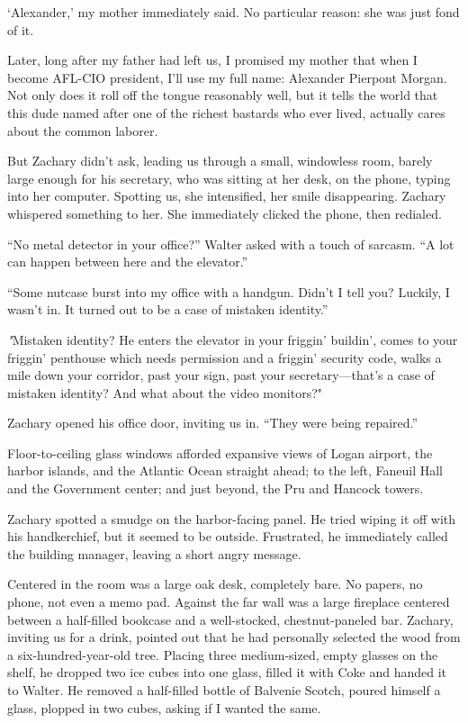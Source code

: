 `Alexander,' my mother immediately said. No particular reason: she was
just fond of it.

Later, long after my father had left us, I promised my mother that when
I become AFL-CIO president, I'll use my full name: Alexander Pierpont
Morgan. Not only does it roll off the tongue reasonably well, but it
tells the world that this dude named after one of the richest bastards
who ever lived, actually cares about the common laborer.

But Zachary didn't ask, leading us through a small, windowless room,
barely large enough for his secretary, who was sitting at her desk, on
the phone, typing into her computer. Spotting us, she intensified, her
smile disappearing. Zachary whispered something to her. She immediately
clicked the phone, then redialed.

``No metal detector in your office?'' Walter asked with a touch of
sarcasm. ``A lot can happen between here and the elevator.''

``Some nutcase burst into my office with a handgun. Didn't I tell you?
Luckily, I wasn't in. It turned out to be a case of mistaken identity.''

\emph{"}Mistaken identity? He enters the elevator in your friggin'
buildin', comes to your friggin' penthouse which needs permission and a
friggin' security code, walks a mile down your corridor, past your sign,
past your secretary---that's a case of mistaken identity? And what about
the video monitors?"

Zachary opened his office door, inviting us in. ``They were being
repaired.''

Floor-to-ceiling glass windows afforded expansive views of Logan
airport, the harbor islands, and the Atlantic Ocean straight ahead; to
the left, Faneuil Hall and the Government center; and just beyond, the
Pru and Hancock towers.

Zachary spotted a smudge on the harbor-facing panel. He tried wiping it
off with his handkerchief, but it seemed to be outside. Frustrated, he
immediately called the building manager, leaving a short angry message.

Centered in the room was a large oak desk, completely bare. No papers,
no phone, not even a memo pad. Against the far wall was a large
fireplace centered between a half-filled bookcase and a well-stocked,
chestnut-paneled bar. Zachary, inviting us for a drink, pointed out that
he had personally selected the wood from a six-hundred-year-old tree.
Placing three medium-sized, empty glasses on the shelf, he dropped two
ice cubes into one glass, filled it with Coke and handed it to Walter.
He removed a half-filled bottle of Balvenie Scotch, poured himself a
glass, plopped in two cubes, asking if I wanted the same.


